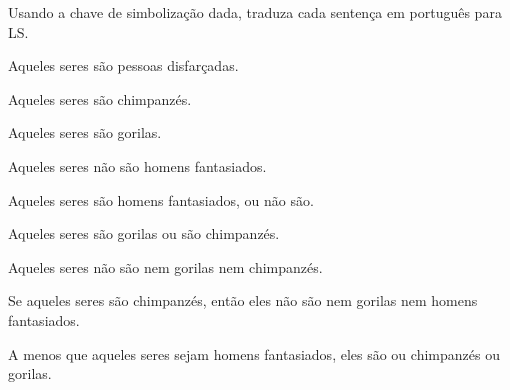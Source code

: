 \practiceproblems

\solutions
\problempart Usando a chave de simbolização dada, traduza cada sentença em português para LS.
\label{pr.monkeysuits}
\begin{ekey}
\item[M:] Aqueles seres são pessoas disfarçadas.
\item[C:] Aqueles seres são chimpanzés.
\item[G:] Aqueles seres são gorilas.
\end{ekey}
\begin{earg}
\item Aqueles seres não são homens fantasiados.
\item Aqueles seres são homens fantasiados, ou não são.
\item Aqueles seres são gorilas ou são chimpanzés.
\item Aqueles seres não são nem gorilas nem chimpanzés.
\item Se aqueles seres são chimpanzés, então eles não são nem gorilas nem homens fantasiados.
\item A menos que aqueles seres sejam homens fantasiados, eles são ou chimpanzés ou gorilas.
\end{earg}


